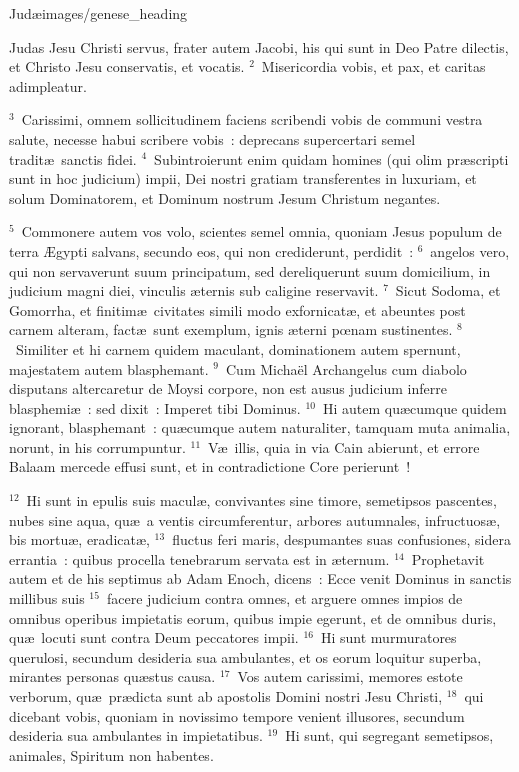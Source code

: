 {Judæ}{images/genese_heading}

\noindent Judas Jesu Christi servus, frater autem Jacobi, his qui sunt in Deo Patre dilectis, et Christo Jesu conservatis, et vocatis.
${}^{2}$~Misericordia vobis, et pax, et caritas adimpleatur.


${}^{3}$~Carissimi, omnem sollicitudinem faciens scribendi vobis de communi vestra salute, necesse habui scribere vobis~: deprecans supercertari semel tradit\ae\ sanctis fidei.
${}^{4}$~Subintroierunt enim quidam homines (qui olim pr\ae scripti sunt in hoc judicium) impii, Dei nostri gratiam transferentes in luxuriam, et solum Dominatorem, et Dominum nostrum Jesum Christum negantes.


${}^{5}$~Commonere autem vos volo, scientes semel omnia, quoniam Jesus populum de terra \AE gypti salvans, secundo eos, qui non crediderunt, perdidit~:
${}^{6}$~angelos vero, qui non servaverunt suum principatum, sed dereliquerunt suum domicilium, in judicium magni diei, vinculis \ae ternis sub caligine reservavit.
${}^{7}$~Sicut Sodoma, et Gomorrha, et finitim\ae\ civitates simili modo exfornicat\ae , et abeuntes post carnem alteram, fact\ae\ sunt exemplum, ignis \ae terni pœnam sustinentes.
${}^{8}$~Similiter et hi carnem quidem maculant, dominationem autem spernunt, majestatem autem blasphemant.
${}^{9}$~Cum Micha\"el Archangelus cum diabolo disputans altercaretur de Moysi corpore, non est ausus judicium inferre blasphemi\ae~: sed dixit~: Imperet tibi Dominus.
${}^{10}$~Hi autem qu\ae cumque quidem ignorant, blasphemant~: qu\ae cumque autem naturaliter, tamquam muta animalia, norunt, in his corrumpuntur.
${}^{11}$~V\ae\ illis, quia in via Cain abierunt, et errore Balaam mercede effusi sunt, et in contradictione Core perierunt~!


${}^{12}$~Hi sunt in epulis suis macul\ae , convivantes sine timore, semetipsos pascentes, nubes sine aqua, qu\ae\ a ventis circumferentur, arbores autumnales, infructuos\ae , bis mortu\ae , eradicat\ae ,
${}^{13}$~fluctus feri maris, despumantes suas confusiones, sidera errantia~: quibus procella tenebrarum servata est in \ae ternum.
${}^{14}$~Prophetavit autem et de his septimus ab Adam Enoch, dicens~: Ecce venit Dominus in sanctis millibus suis
${}^{15}$~facere judicium contra omnes, et arguere omnes impios de omnibus operibus impietatis eorum, quibus impie egerunt, et de omnibus duris, qu\ae\ locuti sunt contra Deum peccatores impii.
${}^{16}$~Hi sunt murmuratores querulosi, secundum desideria sua ambulantes, et os eorum loquitur superba, mirantes personas qu\ae stus causa.
${}^{17}$~Vos autem carissimi, memores estote verborum, qu\ae\ pr\ae dicta sunt ab apostolis Domini nostri Jesu Christi,
${}^{18}$~qui dicebant vobis, quoniam in novissimo tempore venient illusores, secundum desideria sua ambulantes in impietatibus.
${}^{19}$~Hi sunt, qui segregant semetipsos, animales, Spiritum non habentes.



